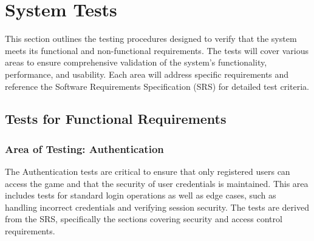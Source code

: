 \documentclass[12pt, titlepage]{article}
\begin{document}
\newpage


\section{System Tests}

This section outlines the testing procedures designed to verify that the system meets its functional and non-functional requirements. The tests will cover various areas to ensure comprehensive validation of the system’s functionality, performance, and usability. Each area will address specific requirements and reference the Software Requirements Specification (SRS) for detailed test criteria.

\subsection{Tests for Functional Requirements}

\subsubsection{Area of Testing: Authentication}

The Authentication tests are critical to ensure that only registered users can access the game and that the security of user credentials is maintained. This area includes tests for standard login operations as well as edge cases, such as handling incorrect credentials and verifying session security. The tests are derived from the SRS, specifically the sections covering security and access control requirements.
\end{document}
